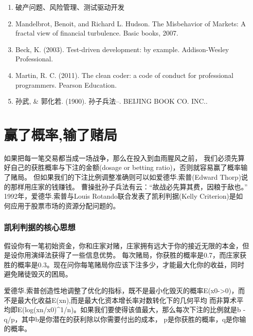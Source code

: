 \documentclass[
  oneside]{book}
\providecommand{\tightlist}{%
  \setlength{\itemsep}{0pt}\setlength{\parskip}{0pt}}
\begin{document}
\begin{enumerate}
\def\labelenumi{\arabic{enumi}.}
\tightlist
\item
  破产问题、风险管理、测试驱动开发
\item
  Mandelbrot, Benoit, and Richard L. Hudson. The Misbehavior of Markets: A fractal view of financial turbulence. Basic books, 2007.
\item
  Beck, K. (2003). Test-driven development: by example. Addison-Wesley Professional.
\item
  Martin, R. C. (2011). The clean coder: a code of conduct for professional programmers. Pearson Education.
\item
  孙武, \& 郭化若. (1900). 孙子兵法--. BEIJING BOOK CO. INC..
\end{enumerate}

\hypertarget{ux8d62ux4e86ux6982ux7387ux8f93ux4e86ux8d4cux5c40}{%
\chapter{赢了概率,输了赌局}\label{ux8d62ux4e86ux6982ux7387ux8f93ux4e86ux8d4cux5c40}}

如果把每一笔交易都当成一场战争，那么在投入到血雨腥风之前，
我们必须先算好自己的获胜概率与下注的金额(dosage or betting ratio)，否则就容易赢了概率输了赌局。
但如果我们的下注比例调整准确则可以如爱德华.索普(Edward Thorp)说的那样用庄家的钱赚钱。
曹操批孙子兵法有云：``故战必先算其费，因粮于敌也。''
1992年，爱德华.索普与Louis Rotando联合发表了凯利判据(Kelly Criterion)是如何应用于股票市场的资源分配问题的。

\hypertarget{ux51efux5229ux5224ux636eux7684ux6838ux5fc3ux601dux60f3}{%
\subsection{凯利判据的核心思想}\label{ux51efux5229ux5224ux636eux7684ux6838ux5fc3ux601dux60f3}}

假设你有一笔初始资金，你和庄家对赌，庄家拥有远大于你的接近无限的本金，但是设你用演绎法获得了一些信息优势。
每次赌局，你获胜的概率是0.7，而庄家获胜的概率是0.3。现在问你每笔赌局你应该下注多少，才能最大化你的收益，同时避免赌徒毁灭的困局。

爱德华.索普创造性地调整了优化的指标，既不是最小化毁灭的概率E(x0-\textgreater0)，而不是最大化收益E(xn),而是最大化资本增长率对数转化下的几何平均
而非算术平均即E(log(xn/x0)\^{}1/n)。如果我们要使得该值最大，那么每次下注的比例就是b - q/p，其中b是你潜在的获利除以你需要付出的成本，
p是你获胜的概率，q是你输的概率。
\end{document}
